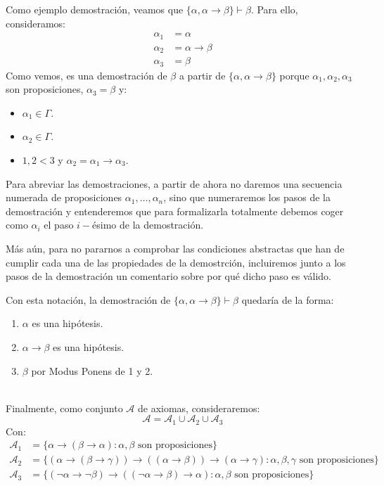 \begin{ejemplo}
    Como ejemplo demostración, veamos que $\{\alpha,\alpha\to\beta\}\vdash \beta$. Para ello, consideramos:
    \begin{align*}
        \alpha_1 &= \alpha \\
        \alpha_2 &= \alpha\to\beta \\
        \alpha_3 &= \beta
    \end{align*}
    Como vemos, es una demostración de $\beta$ a partir de $\{\alpha,\alpha\to\beta\}$ porque $\alpha_1,\alpha_2,\alpha_3$ son proposiciones, $\alpha_3=\beta$ y:
    \begin{itemize}
        \item $\alpha_1\in \Gamma$.
        \item $\alpha_2\in \Gamma$.
        \item $1,2<3$ y $\alpha_2 = \alpha_1\to \alpha_3$.
    \end{itemize}
\end{ejemplo}

\begin{notacion}
    Para abreviar las demostraciones, a partir de ahora no daremos una secuencia numerada de proposiciones $\alpha_1,\ldots,\alpha_n$, sino que numeraremos los pasos de la demostración y entenderemos que para formalizarla totalmente debemos coger como $\alpha_i$ el paso $i-$ésimo de la demostración.

    Más aún, para no pararnos a comprobar las condiciones abstractas que han de cumplir cada una de las propiedades de la demostrción, incluiremos junto a los pasos de la demostración un comentario sobre por qué dicho paso es válido.

    Con esta notación, la demostración de $\{\alpha,\alpha\to\beta\}\vdash \beta$ quedaría de la forma:
    \begin{enumerate}
        \item $\alpha$ es una hipótesis.
        \item $\alpha\to\beta$ es una hipótesis.
        \item $\beta$ por Modus Ponens de 1 y 2.
    \end{enumerate}
\end{notacion}~\\

\noindent
Finalmente, como conjunto $\mathcal{A}$ de axiomas, consideraremos:
\begin{equation*}
    \mathcal{A} = \mathcal{A}_1 \cup \mathcal{A}_2 \cup \mathcal{A}_3
\end{equation*}
Con:
\begin{align*}
    \mathcal{A}_1 &= \{\alpha\to(\beta\to\alpha) : \alpha,\beta \text{\ son proposiciones}\} \\
    \mathcal{A}_2 &= \{(\alpha\to(\beta\to\gamma))\to((\alpha\to\beta))\to(\alpha\to\gamma) : \alpha,\beta,\gamma \text{\ son proposiciones}\} \\
    \mathcal{A}_3 &= \{(\lnot\alpha\to\lnot\beta)\to((\lnot\alpha\to\beta)\to\alpha) : \alpha,\beta \text{\ son proposiciones}\}
\end{align*}

